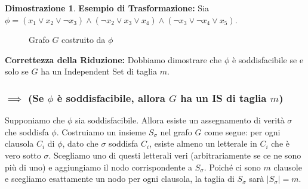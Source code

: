 \documentclass[a4paper]{article}
\theoremstyle{definition} %
\newtheorem*{proof*}{Dimostrazione}
\begin{document}
\begin{proof*}
\textbf{Esempio di Trasformazione:}
Sia $\phi = (x_1 \lor x_2 \lor \neg x_3) \land (\neg x_2 \lor x_3 \lor x_4) \land (\neg x_3 \lor \neg x_4 \lor x_5)$.
\begin{figure}[h]
    \centering
    \caption{Grafo $G$ costruito da $\phi$}
    \label{fig:is_reduction_graph}
\end{figure}

\textbf{Correttezza della Riduzione:}
Dobbiamo dimostrare che $\phi$ è soddisfacibile se e solo se $G$ ha un Independent Set di taglia $m$.

\subsubsection{$\implies$ (Se $\phi$ è soddisfacibile, allora $G$ ha un IS di taglia $m$)}
Supponiamo che $\phi$ sia soddisfacibile. Allora esiste un assegnamento di verità $\sigma$ che soddisfa $\phi$.
Costruiamo un insieme $S_\sigma$ nel grafo $G$ come segue: per ogni clausola $C_i$ di $\phi$, dato che $\sigma$ soddisfa $C_i$, esiste almeno un letterale in $C_i$ che è vero sotto $\sigma$. Scegliamo uno di questi letterali veri (arbitrariamente se ce ne sono più di uno) e aggiungiamo il nodo corrispondente a $S_\sigma$.
Poiché ci sono $m$ clausole e scegliamo esattamente un nodo per ogni clausola, la taglia di $S_\sigma$ sarà $|S_\sigma|=m$.


\end{proof*}
\end{document}
